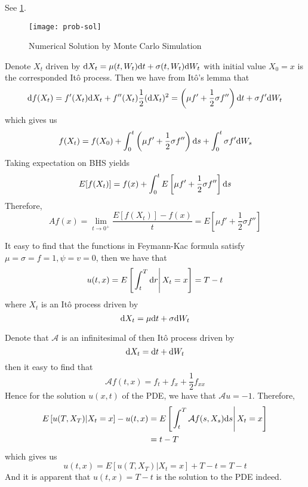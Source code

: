 \documentclass{homework}
\begin{document}
\begin{subproblem}
        \item
        See \cref{fig:prob sol}.
        \begin{figure}[h]
            \centering
            \texttt{[image: prob-sol]}
            \caption{Numerical Solution by Monte Carlo Simulation}
            \label{fig:prob sol}
        \end{figure}
    \end{subproblem}

    \problem
    Denote $X_t$ driven by $\mathrm d X_t=\mu(t,W_t)\mathrm d t+\sigma(t,W_t)\mathrm d W_t$
    with initial value $X_0=x$
    is the corresponded It\^o process. Then we have from It\^o's lemma
    that
    \[\mathrm d f(X_t)=f'(X_t)\mathrm d X_t+f''(X_t)\frac{1}{2}(\mathrm d X_t)^2
    =\left(\mu f'+\frac{1}{2}\sigma f''\right)\mathrm d t+\sigma f'\mathrm d W_t\]
    which gives us
    \[f(X_t)=f(X_0)+\int_0^t\left(\mu f'+\frac{1}{2}\sigma f''\right)\mathrm d s
    +\int_0^t\sigma f'\mathrm d W_s\]
    Taking expectation on BHS yields
    \[E[f(X_t)]=f(x)+\int_0^tE\left[\mu f'+\frac{1}{2}\sigma f''\right]\mathrm d s\]
    Therefore,
    \[Af(x)=\lim_{t\to 0^+}\frac{E[f(X_t)]-f(x)}{t}
    =E\left[\mu f'+\frac{1}{2}\sigma f''\right]\]

    \problem

    \problem
    \begin{subproblem}[(\alph*)]
        \item
        It easy to find that the functions in Feymann-Kac formula
        satisfy $\mu=\sigma=f=1,\psi=v=0$, then we have that 
        \[u(t,x)=E\left[\left.\int_t^T\mathrm d r\right|X_t=x\right]
        =T-t\]
        where $X_t$ is an It\^o process driven by
        \[\mathrm d X_t=\mu\mathrm d t+\sigma\mathrm d W_t\]

        \item
        Denote that $\mathcal A$ is an infinitesimal of
        then It\^o process driven by
        \[\mathrm d X_t=\mathrm d t+\mathrm d W_t\]
        then it easy to find that
        \[\mathcal Af(t,x)=f_t+f_x+\frac{1}{2}f_{xx}\]
        Hence for the solution $u(x,t)$ of the PDE, we have
        that $\mathcal Au=-1$.
        Therefore,
        \[\begin{aligned}
            E\left[u(T,X_T)|X_t=x\right]
            -u(t,x)&=
            E\left[\left.\int_t^{T}
            \mathcal Af(s,X_{s})\mathrm d s\right|X_t=x\right]\\
            &=t-T
        \end{aligned}\]
        which gives us
        \[u(t,x)=E[u(T,X_T)|X_t=x]+T-t=T-t\]
        And it is apparent that $u(t,x)=T-t$ is the solution to the
        PDE indeed.
    \end{subproblem}
\end{document}
